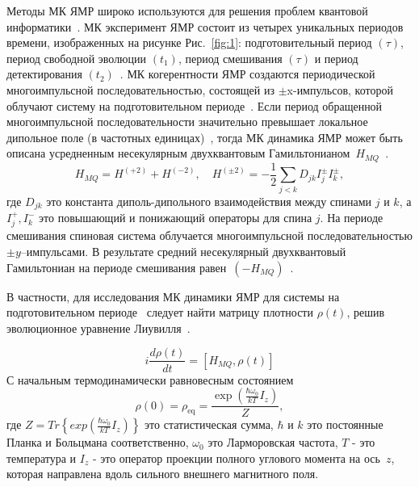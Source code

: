 \documentclass[preprint,12pt]{elsarticle}
\begin{document}
Методы МК ЯМР широко используются для решения проблем квантовой информатики~\cite{17,18}. 
МК эксперимент ЯМР состоит из четырех уникальных периодов времени, изображенных на рисунке Рис.~\ref{fig:1}:
подготовительный период $(\tau)$, период свободной эволюции $(t_1)$, период смешивания $(\tau)$ и период детектирования $(t_2)$~\cite{10}.
МК когерентности ЯМР создаются периодической многоимпульсной последовательностью, 
состоящей из $\pm$x-импульсов, которой облучают систему на подготовительном периоде~\cite{10}.
Если период обращенной многоимпульсной последовательности значительно превышает локальное дипольное поле (в частотных единицах)~\cite{19}, 
тогда МК динамика ЯМР может быть описана усредненным несекулярным двухквантовым Гамильтонианом~$H_{MQ}$~\cite{20}. 
%
\begin{equation} \label{eq:1}
        H_{MQ} = H^{(+2)} + H^{(-2)} , \quad
        H^{(\pm 2)} = -\frac{1}{2} \sum_{j<k} D_{jk} I_{j} ^\pm I_k^\pm,
\end{equation}
%
где $D_{jk}$ это константа диполь-дипольного взаимодействия между спинами $j$ и $k$,
а $I_{j}^+, I_k ^-$ это повышающий и понижающий операторы для спина $j$.
На периоде смешивания спиновая система облучается многоимпульсной последовательностью $\pm y$--импульсами. 
В результате средний несекулярный двухквантовый Гамильтониан  на периоде смешивания равен~$(-H_{MQ})$~\cite{10}.


В частности, для исследования МК динамики ЯМР для системы на подготовительном периоде~\cite{10} 
следует найти матрицу плотности $\rho(t)$, решив эволюционное уравнение Лиувилля~\cite{19}. 

\begin{equation}
    \label{eq:2}
        i\frac{d\rho(t)}{dt} = [H_{MQ}, \rho(t)]
\end{equation}
С начальным термодинамически равновесным состоянием
\begin{equation}
    \label{eq:3}
        \rho(0) = \rho_\mathrm{eq} = \frac{\exp(\frac{\hbar \omega_0}{kT}I_z)}{Z},
\end{equation}
где $Z=Tr \left\{exp\left(\frac{\hbar \omega_0}{kT}I_z\right) \right\}$ это статистическая сумма,
$\hbar$ и $k$ это постоянные Планка и Больцмана соответственно,
$\omega_0$ это Ларморовская частота, 
$T$ - это температура
и $I_z$ - это оператор проекции полного углового момента на ось~$z$,
которая направлена вдоль сильного внешнего магнитного поля. 
\end{document}
